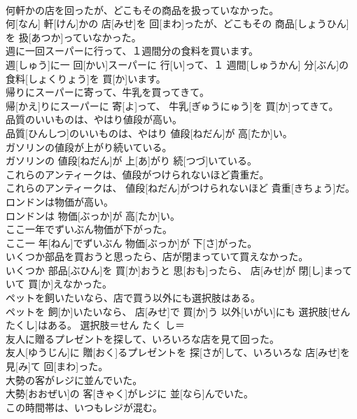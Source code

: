 \documentclass[8pt]{extreport}
\begin{document}
\begin{CJK}{UTF8}{min}
\\	何軒かの店を回ったが、どこもその商品を扱っていなかった。	
\\	何[なん] 軒[けん]かの 店[みせ]を 回[まわ]ったが、どこもその 商品[しょうひん]を 扱[あつか]っていなかった。	
\\	週に一回スーパーに行って、１週間分の食料を買います。	
\\	週[しゅう]に一 回[かい]スーパーに 行[い]って、１ 週間[しゅうかん] 分[ぶん]の 食料[しょくりょう]を 買[か]います。	
\\	帰りにスーパーに寄って、牛乳を買ってきて。	
\\	帰[かえ]りにスーパーに 寄[よ]って、 牛乳[ぎゅうにゅう]を 買[か]ってきて。	
\\	品質のいいものは、やはり値段が高い。	
\\	品質[ひんしつ]のいいものは、やはり 値段[ねだん]が 高[たか]い。	
\\	ガソリンの値段が上がり続いている。	
\\	ガソリンの 値段[ねだん]が 上[あ]がり 続[つづ]いている。	
\\	これらのアンティークは、値段がつけられないほど貴重だ。	
\\	これらのアンティークは、 値段[ねだん]がつけられないほど 貴重[きちょう]だ。	
\\	ロンドンは物価が高い。	
\\	ロンドンは 物価[ぶっか]が 高[たか]い。	
\\	ここ一年でずいぶん物価が下がった。	
\\	ここ一 年[ねん]でずいぶん 物価[ぶっか]が 下[さ]がった。	
\\	いくつか部品を買おうと思ったら、店が閉まっていて買えなかった。	
\\	いくつか 部品[ぶひん]を 買[か]おうと 思[おも]ったら、 店[みせ]が 閉[し]まっていて 買[か]えなかった。	
\\	ペットを飼いたいなら、店で買う以外にも選択肢はある。	
\\	ペットを 飼[か]いたいなら、 店[みせ]で 買[か]う 以外[いがい]にも 選択肢[せんたくし]はある。	選択肢＝せん たく し＝ 
\\	友人に贈るプレゼントを探して、いろいろな店を見て回った。	
\\	友人[ゆうじん]に 贈[おく]るプレゼントを 探[さが]して、いろいろな 店[みせ]を 見[み]て 回[まわ]った。	
\\	大勢の客がレジに並んでいた。	
\\	大勢[おおぜい]の 客[きゃく]がレジに 並[なら]んでいた。	
\\	この時間帯は、いつもレジが混む。	

\end{CJK}
\end{document}
